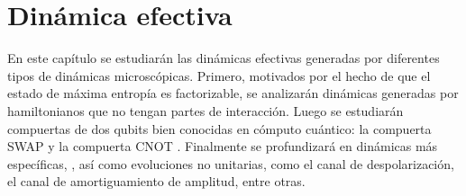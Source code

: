 \chapter{Dinámica efectiva}\label{sec:chapter3}

En este capítulo se estudiarán las dinámicas efectivas generadas   por diferentes tipos de dinámicas microscópicas. Primero, motivados por el hecho de que el estado de máxima entropía es factorizable, se analizarán dinámicas generadas por hamiltonianos que no tengan partes de interacción. Luego se estudiarán compuertas de dos qubits bien conocidas en cómputo cuántico: la compuerta SWAP y la compuerta CNOT . Finalmente se profundizará en dinámicas más específicas, , así como evoluciones no unitarias, como el canal de despolarización, el canal de amortiguamiento de amplitud, entre otras.




\newpage
